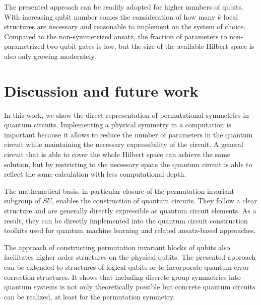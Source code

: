 \documentclass[%
 reprint,
 amsmath,amssymb,
 aps,
]{revtex4-2}
\theoremstyle{definition}%
\begin{document}
The presented approach can be readily adopted for higher numbers of qubits. With increasing qubit number comes the consideration of how many $k$-local structures are necessary and reasonable to implement on the system of choice. Compared to the non-symmetrized ansatz, the fraction of parameters to non-parametrized two-qubit gates is low, but the size of the available Hilbert space is also only growing moderately. 



\section{Discussion and future work}

In this work, we show the direct representation of permutational symmetries in quantum circuits. Implementing a physical symmetry in a computation is important because it allows to reduce the number of parameters in the quantum circuit while maintaining the necessary expressibility of the circuit. A general circuit that is able to cover the whole Hilbert space can achieve the same solution, but by restricting to the necessary space the quantum circuit is able to reflect the same calculation with less computational depth. %

The mathematical basis, in particular closure of the permutation invariant subgroup of $SU$, enables the construction of quantum circuits. They follow a clear structure and are generally directly expressible as quantum circuit elements. As a result, they can be directly implemented into the quantum circuit construction toolkits used for quantum machine learning and related ansatz-based approaches. 

The approach of constructing permutation invariant blocks of qubits also facilitates higher order structures on the physical qubits. The presented approach can be extended to structures of logical qubits or to incorporate quantum error correction structures. It shows that including discrete group symmetries into quantum systems is not only theoretically possible but concrete quantum circuits can be realized, at least for the permutation symmetry. 
\end{document}
